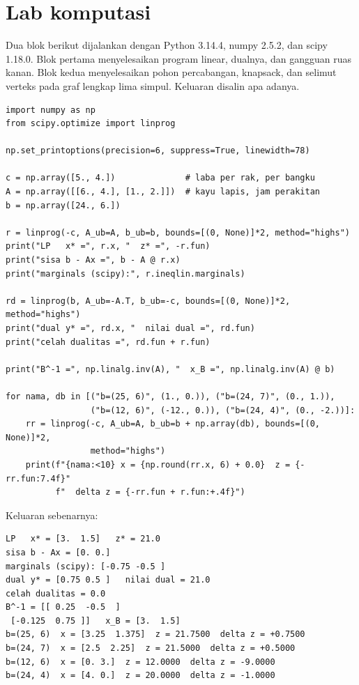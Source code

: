 
\section{Lab komputasi}

Dua blok berikut dijalankan dengan Python 3.14.4, numpy 2.5.2, dan scipy 1.18.0. Blok
pertama menyelesaikan program linear, dualnya, dan gangguan ruas kanan. Blok kedua
menyelesaikan pohon percabangan, knapsack, dan selimut verteks pada graf lengkap lima
simpul. Keluaran disalin apa adanya.

\begin{lab}
\begin{verbatim}
import numpy as np
from scipy.optimize import linprog

np.set_printoptions(precision=6, suppress=True, linewidth=78)

c = np.array([5., 4.])              # laba per rak, per bangku
A = np.array([[6., 4.], [1., 2.]])  # kayu lapis, jam perakitan
b = np.array([24., 6.])

r = linprog(-c, A_ub=A, b_ub=b, bounds=[(0, None)]*2, method="highs")
print("LP   x* =", r.x, "  z* =", -r.fun)
print("sisa b - Ax =", b - A @ r.x)
print("marginals (scipy):", r.ineqlin.marginals)

rd = linprog(b, A_ub=-A.T, b_ub=-c, bounds=[(0, None)]*2, method="highs")
print("dual y* =", rd.x, "  nilai dual =", rd.fun)
print("celah dualitas =", rd.fun + r.fun)

print("B^-1 =", np.linalg.inv(A), "  x_B =", np.linalg.inv(A) @ b)

for nama, db in [("b=(25, 6)", (1., 0.)), ("b=(24, 7)", (0., 1.)),
                 ("b=(12, 6)", (-12., 0.)), ("b=(24, 4)", (0., -2.))]:
    rr = linprog(-c, A_ub=A, b_ub=b + np.array(db), bounds=[(0, None)]*2,
                 method="highs")
    print(f"{nama:<10} x = {np.round(rr.x, 6) + 0.0}  z = {-rr.fun:7.4f}"
          f"  delta z = {-rr.fun + r.fun:+.4f}")
\end{verbatim}
Keluaran sebenarnya:
\begin{verbatim}
LP   x* = [3.  1.5]   z* = 21.0
sisa b - Ax = [0. 0.]
marginals (scipy): [-0.75 -0.5 ]
dual y* = [0.75 0.5 ]   nilai dual = 21.0
celah dualitas = 0.0
B^-1 = [[ 0.25  -0.5  ]
 [-0.125  0.75 ]]   x_B = [3.  1.5]
b=(25, 6)  x = [3.25  1.375]  z = 21.7500  delta z = +0.7500
b=(24, 7)  x = [2.5  2.25]  z = 21.5000  delta z = +0.5000
b=(12, 6)  x = [0. 3.]  z = 12.0000  delta z = -9.0000
b=(24, 4)  x = [4. 0.]  z = 20.0000  delta z = -1.0000
\end{verbatim}
\end{lab}

